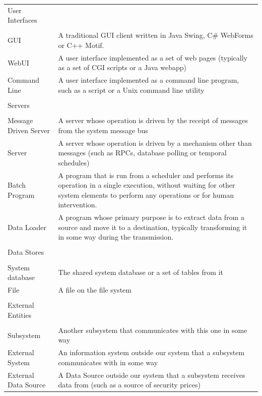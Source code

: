 \begin{table}
\begin{tabular}{l p{10cm}}
User Interfaces \\
\cline{1-1}
& \\
GUI   & A traditional GUI client written in Java Swing, C\# WebForms or C++ Motif. \\
WebUI & A user interface implemented as a set of web pages (typically as a set of CGI scripts or a Java webapp) \\
Command Line & A user interface implemented as a command line program, such as a script or a Unix command line utility \\
& \\
Servers \\
\cline{1-1}
& \\
Message Driven Server & A server whose operation is driven by the receipt of messages from the system message bus \\
Server                &  A server whose operation is driven by a mechanism other than messages (such as RPCs, database polling or temporal schedules) \\
Batch Program         & A program that is run from a scheduler and performs its operation in a single execution, without waiting for other system elements to perform any operations or for human intervention. \\
Data Loader           & A program whose primary purpose is to extract data from a source and move it to a destination, typically transforming it in some way during the transmission. \\
& \\
Data Stores  \\
\cline{1-1}
& \\
System database   &  The shared system database or a set of tables from it \\
File              & A file on the file system \\
& \\
External Entities  \\
\cline{1-1}
& \\
Subsystem            & Another subsystem that communicates with this one in some way \\
External System      & An information system outside our system that a subsystem communicates with in some way \\
External Data Source & A Data Source outside our system that a subsystem receives data from (such as a source of security prices)
\end{tabular}
\end{table}

